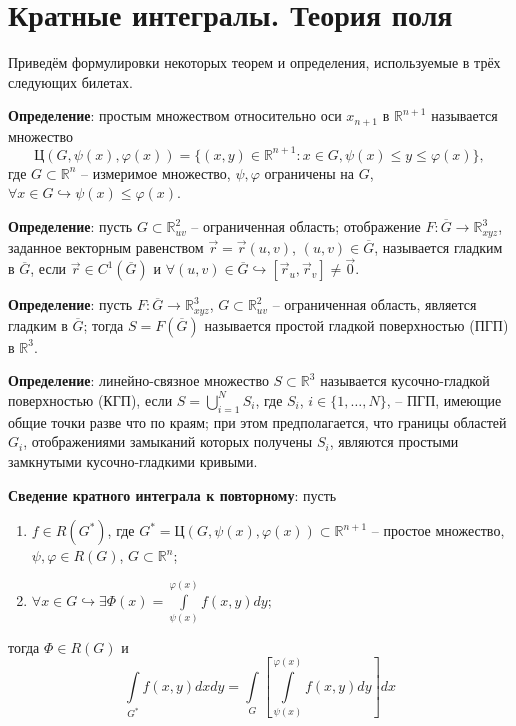 \documentclass[12pt, a4paper, reqno]{article}
\begin{document}
\newpage
\section{Кратные интегралы. Теория поля}

    Приведём формулировки некоторых теорем и определения, используемые в трёх следующих билетах.

    \textbf{Определение}: простым множеством относительно оси $x_{n + 1}$ в $\mathbb{R}^{n + 1}$
    называется множество
    \begin{equation*}
        \text{Ц}(G, \psi(x), \varphi(x)) =
            \{(x, y) \in \mathbb{R}^{n + 1}: x \in G, \psi(x) \leq y \leq \varphi(x)\},
    \end{equation*}
    где $G \subset \mathbb{R}^n$ -- измеримое множество, $\psi, \varphi$ ограничены на $G$,
    $\forall x \in G \hookrightarrow \psi(x) \leq \varphi(x)$.

    \textbf{Определение}: пусть $G \subset \mathbb{R}_{uv}^2$ -- ограниченная область; отображение
    $F: \overline{G} \to \mathbb{R}_{xyz}^3$, заданное векторным равенством $\vec{r} = \vec{r}(u, v)$,
    $(u, v) \in \overline{G}$, называется гладким в $\overline{G}$, если $\vec{r} \in C^1(\overline{G})$
    и $\forall (u, v) \in \overline{G} \hookrightarrow [\vec{r}_u, \vec{r}_v] \neq \vec{0}$.

    \textbf{Определение}: пусть $F: \overline{G} \to \mathbb{R}_{xyz}^3$, $G \subset \mathbb{R}_{uv}^2$ --
    ограниченная область, является гладким в $\overline{G}$; тогда $S = F(\overline{G})$ называется
    простой гладкой поверхностью (ПГП) в $\mathbb{R}^3$.

    \textbf{Определение}: линейно-связное множество $S \subset \mathbb{R}^3$ называется кусочно-гладкой
    поверхностью (КГП), если $S = \bigcup\limits_{i = 1}^{N} S_i$, где $S_i$, $i \in \{1, \ldots, N\}$, --
    ПГП, имеющие общие точки разве что по краям; при этом предполагается, что границы областей
    $G_i$, отображениями замыканий которых получены $S_i$, являются простыми замкнутыми кусочно-гладкими
    кривыми.

    \textbf{Сведение кратного интеграла к повторному}: пусть
    \begin{enumerate}
        \item $f \in R(G^{*})$, где $G^{*} = \text{Ц}(G, \psi(x), \varphi(x)) \subset
              \mathbb{R}^{n + 1}$ -- простое множество, $\psi, \varphi \in R(G)$,
              $G \subset \mathbb{R}^n$;
        \item $\forall x \in G \hookrightarrow \exists \Phi(x) = \int\limits_{\psi(x)}^{\varphi(x)} f(x, y)dy$;
    \end{enumerate}
    тогда $\Phi \in R(G)$ и
    \begin{equation*}
        \int\limits_{G^{*}} f(x, y) dx dy =
        \int\limits_{G} \left[\int\limits_{\psi(x)}^{\varphi(x)} f(x, y) dy\right] dx
    \end{equation*}
\end{document}
